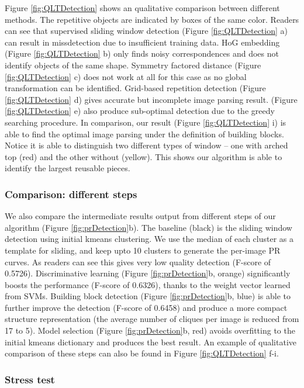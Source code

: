 \documentclass{acmtog}
\begin{document}
Figure \ref{fig:QLTDetection} shows an qualitative comparison between different methods. The repetitive objects are indicated by boxes of the same color. Readers can see that supervised sliding window detection (Figure \ref{fig:QLTDetection} a) can result in missdetection due to insufficient training data. HoG embedding  (Figure \ref{fig:QLTDetection} b) only finds noisy correspondences and does not identify objects of the same shape. Symmetry factored distance \cite{LIPMANsig2010} (Figure \ref{fig:QLTDetection} c) does not work at all for this case as no global transformation can be identified. Grid-based repetition detection \cite{Wu2010DL}  (Figure \ref{fig:QLTDetection} d) gives accurate but incomplete image parsing result. \cite{Liu2013GRASP} (Figure \ref{fig:QLTDetection} e) also produce sub-optimal detection due to the greedy searching procedure. In comparison, our result (Figure \ref{fig:QLTDetection} i) is able to find the optimal image parsing under the definition of building blocks. Notice it is able to distinguish two different types of window -- one with arched top (red) and the other without (yellow). This shows our algorithm is able to identify the largest reusable pieces.


\subsubsection{Comparison: different steps}

We also compare the intermediate results output from different steps of our algorithm (Figure \ref{fig:prDetection}b). The baseline (black) is the sliding window detection using initial kmeans clustering. We use the median of each cluster as a template for sliding, and keep upto 10 clusters to generate the per-image PR curves. As readers can see this gives very low quality detection (F-score of 0.5726). Discriminative learning (Figure \ref{fig:prDetection}b, orange) significantly boosts the performance (F-score of 0.6326), thanks to the weight vector learned from SVMs. Building block detection (Figure \ref{fig:prDetection}b, blue) is able to further improve the detection (F-score of 0.6458) and produce a more compact structure representation (the average number of cliques per image is reduced from 17 to 5). Model selection (Figure \ref{fig:prDetection}b, red) avoids overfitting to the initial kmeans dictionary and produces the best result. An example of qualitative comparison of these steps can also be found in Figure \ref{fig:QLTDetection} f-i.

\subsubsection{Stress test}
\end{document}
